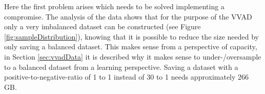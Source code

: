 Here the first problem arises which needs to be solved implementing a compromise. 
The analysis of the data shows that for the purpose of the VVAD only a very imbalanced dataset can be constructed (see Figure \ref{fig:sampleDistribution}), knowing that it is possible to reduce the size needed by only saving a balanced dataset. 
This makes sense from a perspective of capacity, in Section \ref{sec:vvadData}
it is described why it makes sense to under-/oversample to a balanced dataset from a learning perspective.
Saving a dataset with a positive-to-negative-ratio of 1 to 1 instead of 30 to 1 needs approximately 266 GB.

